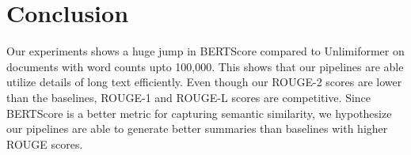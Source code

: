 \section{Conclusion}

Our experiments shows a huge jump in BERTScore compared to Unlimiformer on
documents with word counts upto 100,000.
This shows that our pipelines are able utilize details of long text efficiently.
Even though our ROUGE-2 scores are lower than the baselines, ROUGE-1 and ROUGE-L
scores are competitive.
Since BERTScore is a better metric for capturing semantic similarity, we hypothesize
our pipelines are able to generate better summaries than baselines with higher
ROUGE scores. 
